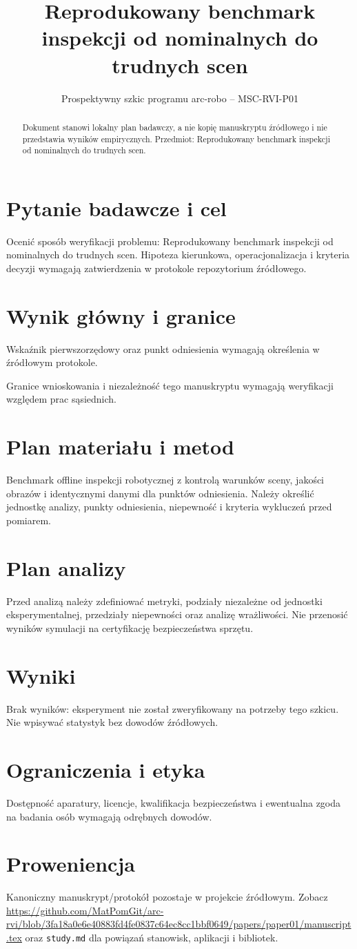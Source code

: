 \documentclass[11pt,a4paper]{article}
\title{Reprodukowany benchmark inspekcji od nominalnych do trudnych scen}
\author{}
\date{Prospektywny szkic programu arc-robo -- MSC-RVI-P01}
\begin{document}
\maketitle
\begin{abstract}
Dokument stanowi lokalny plan badawczy, a nie kopię manuskryptu źródłowego i nie przedstawia wyników empirycznych. Przedmiot: Reprodukowany benchmark inspekcji od nominalnych do trudnych scen.
\end{abstract}
\section{Pytanie badawcze i cel}
Ocenić sposób weryfikacji problemu: Reprodukowany benchmark inspekcji od nominalnych do trudnych scen. Hipoteza kierunkowa, operacjonalizacja i kryteria decyzji wymagają zatwierdzenia w protokole repozytorium źródłowego.
\section{Wynik główny i granice}
Wskaźnik pierwszorzędowy oraz punkt odniesienia wymagają określenia w źródłowym protokole.

Granice wnioskowania i niezależność tego manuskryptu wymagają weryfikacji względem prac sąsiednich.
\section{Plan materiału i metod}
Benchmark offline inspekcji robotycznej z kontrolą warunków sceny, jakości obrazów i identycznymi danymi dla punktów odniesienia. Należy określić jednostkę analizy, punkty odniesienia, niepewność i kryteria wykluczeń przed pomiarem.
\section{Plan analizy}
Przed analizą należy zdefiniować metryki, podziały niezależne od jednostki eksperymentalnej, przedziały niepewności oraz analizę wrażliwości. Nie przenosić wyników symulacji na certyfikację bezpieczeństwa sprzętu.
\section{Wyniki}
Brak wyników: eksperyment nie został zweryfikowany na potrzeby tego szkicu. Nie wpisywać statystyk bez dowodów źródłowych.
\section{Ograniczenia i etyka}
Dostępność aparatury, licencje, kwalifikacja bezpieczeństwa i ewentualna zgoda na badania osób wymagają odrębnych dowodów.
\section{Proweniencja}
Kanoniczny manuskrypt/protokół pozostaje w projekcie źródłowym. Zobacz \url{https://github.com/MatPomGit/arc-rvi/blob/3fa18a0e6e40883fd4fe0837c64ec8cc1bbf0649/papers/paper01/manuscript.tex} oraz \texttt{study.md} dla powiązań stanowisk, aplikacji i bibliotek.
\end{document}
